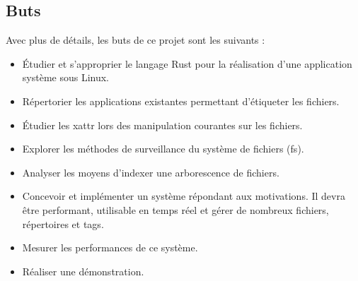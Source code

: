 \subsection{Buts}
Avec plus de détails, les buts de ce projet sont les suivants :
\begin{itemize}
    \item Étudier et s'approprier le langage Rust pour la réalisation d'une application système sous Linux.
    \item Répertorier les applications existantes permettant d'étiqueter les fichiers.
    \item Étudier les \acrshort{xattr} lors des manipulation courantes sur les fichiers.
    \item Explorer les méthodes de surveillance du système de fichiers (\acrshort{fs}).
    \item Analyser les moyens d'indexer une arborescence de fichiers.
    \item Concevoir et implémenter un système répondant aux motivations. Il devra être performant, 
        utilisable en temps réel et gérer de nombreux fichiers, répertoires et tags.
    \item Mesurer les performances de ce système.
    \item Réaliser une démonstration.
\end{itemize}
